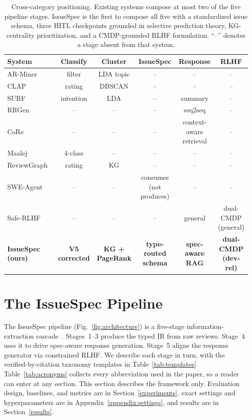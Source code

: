 \documentclass[sigconf, anonymous]{acmart}
\begin{document}
\begin{table}[t]
  \centering
  \footnotesize
  \setlength{\tabcolsep}{4pt}
  \caption{Cross-category positioning. Existing systems compose at most two of the five pipeline
   stages. IssueSpec is the first to compose all five with a standardized issue schema, three
  HITL checkpoints grounded in selective prediction theory, KG-centrality prioritization, and a
  CMDP-grounded RLHF formulation. ``--'' denotes a stage absent from that system.}
  \label{tab:cross-category}
  \begin{tabular}{lccccc}
  \toprule
  System & Classify & Cluster & IssueSpec & Response & RLHF \\
  \midrule
  AR-Miner~\cite{chen2014ar} & filter & LDA topic & -- & -- & -- \\
  CLAP~\cite{villarroel2016release} & rating & DBSCAN & -- & -- & -- \\
  SURF~\cite{di2017surf} & intention & LDA & -- & summary & -- \\
  RRGen~\cite{gao2019automating} & -- & -- & -- & seq2seq & -- \\
  CoRe~\cite{gao2021automating} & -- & -- & -- & context-aware retrieval & -- \\
  Maalej~\cite{maalej2015bug} & 4-class & -- & -- & -- & -- \\
  ReviewGraph~\cite{de2025reviewgraph} & rating & KG & -- & -- & -- \\
  SWE-Agent~\cite{yang2024swe} & -- & -- & consumes (not produces) & -- & -- \\
  Safe-RLHF~\cite{dai2024safe} & -- & -- & -- & general & dual-CMDP (general) \\
  \textbf{IssueSpec (ours)} & \textbf{V5 corrected} & \textbf{KG + PageRank} &
  \textbf{type-routed schema} & \textbf{spec-aware RAG} & \textbf{dual-CMDP (dev-rel)} \\
  \bottomrule
  \end{tabular}
  \end{table}

\section{The IssueSpec Pipeline}\label{system-design}

The IssueSpec pipeline (Fig.~\ref{fig:architecture}) is a five-stage information-extraction cascade~\cite{hearst1999untangling, sarawagi2008information}. Stages~1--3 produce the typed IR from raw reviews. Stage~4 uses it to drive spec-aware response generation. Stage~5 aligns the response generator via constrained RLHF. We describe each stage in turn, with the verified-by-citation taxonomy templates in Table~\ref{tab:templates}. Table~\ref{tab:acronyms} collects every abbreviation used in the paper, so a reader can enter at any section. This section describes the framework only. Evaluation design, baselines, and metrics are in Section~\ref{experiments}, exact settings and hyperparameters are in Appendix~\ref{appendix:settings}, and results are in Section~\ref{results}.
\end{document}
